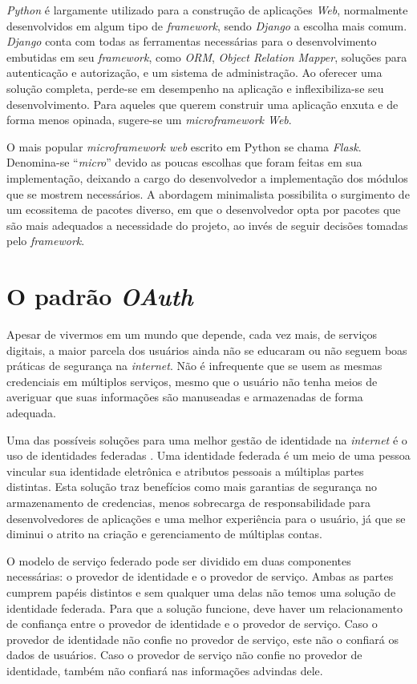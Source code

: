   \emph{Python} é largamente utilizado para a construção de aplicações \emph{Web}, normalmente 
  desenvolvidos em algum tipo de \emph{framework}, sendo \emph{Django} a escolha mais comum.
  \emph{Django} conta com todas as ferramentas necessárias para o desenvolvimento 
  embutidas em seu \emph{framework}, como \emph{ORM}, \emph{Object Relation Mapper}, 
  soluções para autenticação e autorização, e um sistema de administração. Ao oferecer
  uma solução completa, perde-se em desempenho na aplicação e inflexibiliza-se seu 
  desenvolvimento. Para aqueles 
  que querem construir uma aplicação enxuta e de forma menos opinada, sugere-se um
  \emph{microframework Web}. 

  O mais popular \emph{microframework web} escrito em Python se chama \emph{Flask}.
  Denomina-se ``\emph{micro}'' devido as poucas escolhas que foram feitas 
  em sua implementação,
  deixando a cargo do desenvolvedor a implementação dos módulos que se mostrem 
  necessários. A abordagem minimalista possibilita o surgimento de um ecossitema de 
  pacotes diverso, em que o desenvolvedor opta por pacotes que são mais adequados a 
  necessidade do projeto, ao invés de seguir decisões tomadas pelo \emph{framework}.

  \section{O padrão \emph{OAuth}}
  Apesar de vivermos em um mundo que depende, cada vez mais, de serviços digitais,
  a maior parcela dos usuários ainda não se educaram ou 
  não seguem boas práticas de segurança na \emph{internet}. Não é infrequente que se 
  usem as mesmas credenciais em múltiplos serviços, mesmo que o usuário 
  não tenha meios de averiguar que suas informações são manuseadas e armazenadas de forma 
  adequada.

  Uma das possíveis soluções para uma melhor gestão de identidade na \emph{internet} 
  é o uso de identidades federadas \cite{208723}. Uma identidade federada é um meio 
  de uma pessoa vincular sua identidade eletrônica e atributos pessoais 
  a múltiplas partes distintas. Esta solução traz benefícios como mais garantias
  de segurança no armazenamento de credencias, menos sobrecarga de responsabilidade 
  para desenvolvedores de aplicações e uma melhor experiência para o usuário, já que se 
  diminui o atrito na criação e gerenciamento de múltiplas contas.

  O modelo de serviço federado pode ser dividido em duas componentes necessárias: 
  o provedor de identidade e o provedor de serviço. Ambas as partes cumprem papéis 
  distintos e sem qualquer uma delas não temos uma solução de identidade federada. 
  Para que a solução funcione, deve haver um relacionamento de confiança entre 
  o provedor de identidade e o provedor de serviço. Caso o provedor de identidade 
  não confie no provedor de serviço, este não o confiará os dados de usuários.
  Caso o provedor de serviço não confie no provedor de identidade, 
  também não confiará nas informações advindas dele.

